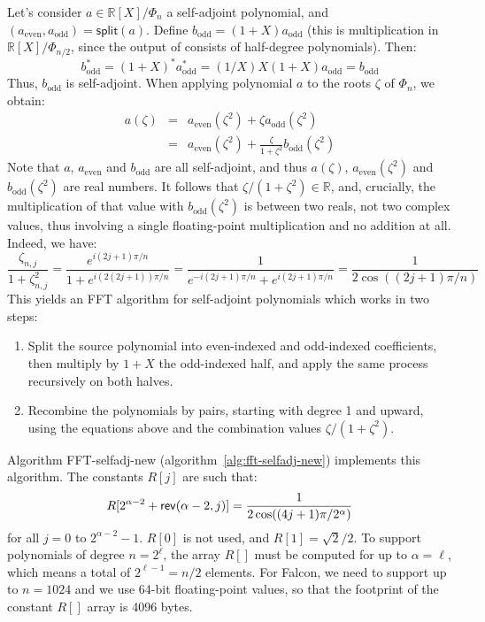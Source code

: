 \documentclass{llncs}
\newcommand{\bR}{\mathbb{R}}
\newcommand{\adj}[1]{{#1}^*}
\begin{document}
Let's consider $a \in \bR[X]/\Phi_n$ a self-adjoint polynomial, and
$(a_{\text{even}}, a_{\text{odd}}) = \textsf{split}(a)$. Define
$b_{\text{odd}} = (1 + X) a_{\text{odd}}$ (this is multiplication in
$\bR[X]/\Phi_{n/2}$, since the output of  consists
of half-degree polynomials). Then:
\begin{equation*}
    \adj{b}_{\text{odd}} = \adj{(1 + X)} \adj{a}_{\text{odd}}
        = (1/X) X (1 + X) a_{\text{odd}} = b_{\text{odd}}
\end{equation*}
Thus, $b_{\text{odd}}$ is self-adjoint. When applying polynomial $a$ to
the roots $\zeta$ of $\Phi_n$, we obtain:
\begin{eqnarray*}
    a(\zeta) &=& a_{\text{even}}(\zeta^2) + \zeta a_{\text{odd}}(\zeta^2) \\
             &=& a_{\text{even}}(\zeta^2)
                 + \frac{\zeta}{1 + \zeta^2} b_{\text{odd}}(\zeta^2)
\end{eqnarray*}
Note that $a$, $a_{\text{even}}$ and $b_{\text{odd}}$ are all
self-adjoint, and thus $a(\zeta)$, $a_{\text{even}}(\zeta^2)$ and
$b_{\text{odd}}(\zeta^2)$ are real numbers. It follows that $\zeta/(1 +
\zeta^2) \in \bR$, and, crucially, the multiplication of that value with
$b_{\text{odd}}(\zeta^2)$ is between two reals, not two complex values,
thus involving a single floating-point multiplication and no addition at
all. Indeed, we have:
\begin{equation*}
    \frac{\zeta_{n,j}}{1 + \zeta_{n,j}^2}
        = \frac{e^{i(2j+1)\pi/n}}{1 + e^{i(2(2j+1))\pi/n}}
        = \frac{1}{e^{-i(2j+1)\pi/n} + e^{i(2j+1)\pi/n}}
        = \frac{1}{2\cos ((2j+1)\pi/n)}
\end{equation*}
This yields an FFT algorithm for self-adjoint polynomials which works
in two steps:
\begin{enumerate}
    \item Split the source polynomial into even-indexed and odd-indexed
    coefficients, then multiply by $1 + X$ the odd-indexed half, and
    apply the same process recursively on both halves.
    \item Recombine the polynomials by pairs, starting with degree 1
    and upward, using the equations above and the combination values
    $\zeta/(1 + \zeta^2)$.
\end{enumerate}
Algorithm \textsf{FFT-selfadj-new} (algorithm~\ref{alg:fft-selfadj-new})
implements this algorithm. The constants $R[j]$ are such that:
\begin{equation*}
    R[2^{\alpha - 2} + \text{\textsf{rev}}(\alpha - 2, j)]
        = \frac{1}{2 \cos ((4 j + 1)\pi/2^\alpha)}
\end{equation*}
for all $j = 0$ to $2^{\alpha - 2} - 1$. $R[0]$ is not used, and $R[1] =
\sqrt{2}/2$. To support polynomials of degree $n = 2^\ell$, the array
$R[]$ must be computed for up to $\alpha = \ell$, which means a total of
$2^{\ell - 1} = n/2$ elements. For Falcon, we need to support up to $n =
1024$ and we use 64-bit floating-point values, so that the footprint of
the constant $R[]$ array is 4096 bytes.
\end{document}
